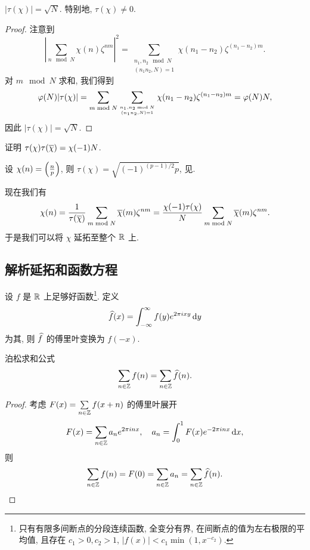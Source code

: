 \begin{lemma}{}{}
$|\tau(\chi)|=\sqrt{N}.$ 特别地, $\tau(\chi)\neq0$.
\end{lemma}
\begin{proof}
注意到
  \[\left|\sum_{n\mod N}\chi(n)\zeta^{nm}\right|^2=\sum_{\substack{n_1,n_2\mod N\\(n_1n_2,N)=1}}\chi(n_1-n_2)\zeta^{(n_1-n_2)m}.\]
对 $m\mod N$ 求和, 我们得到
  \[\varphi(N)|\tau(\chi)|=\sum_{m\mod N}\sum_{n_1,n_2\mod N\atop (n_1n_2,N)=1}\chi(n_1-n_2)\zeta^{(n_1-n_2)m}=\varphi(N)N,\]
因此 $|\tau(\chi)|=\sqrt N$.
\end{proof}

\begin{exercise}
证明 $\tau(\chi)\tau(\ov\chi)=\chi(-1)N$.
\end{exercise}

\begin{example}
设 $\chi(n)=\leg{n}{p}$, 则 $\tau(\chi)=\sqrt{(-1)^{(p-1)/2}p}$, 见\cite[Chapter IV, \S 3]{Lang1994}.
\end{example}


现在我们有
  \[\chi(n)=\frac1{\tau(\ov{\chi})}\sum_{m\mod N}\ov\chi(m)\zeta^{nm}
=\frac{\chi(-1)\tau(\chi)}N\sum_{m\mod N}\ov\chi(m)\zeta^{nm}.\]
于是我们可以将 $\chi$ 延拓至整个 $\BR$ 上.


\subsection{解析延拓和函数方程}
设 $f$ 是 $\BR$ 上足够好函数\footnote{只有有限多间断点的分段连续函数, 全变分有界, 在间断点的值为左右极限的平均值, 且存在 $c_1>0,c_2>1$, $|f(x)|<c_1\min (1,x^{-c_2})$.}.
定义
  \[\wh f(x)=\int_{-\infty}^\infty f(y)e^{2\pi ixy}\diff y\]
为其, 则 $\wh f$ 的傅里叶变换为 $f(-x)$. 

\begin{proposition}{泊松求和公式}{}
  \[\sum_{n\in\BZ} f(n)=\sum_{n\in\BZ} \wh f(n).\]
\end{proposition}
\begin{proof}
考虑 $F(x)=\suml_{n\in\BZ} f(x+n)$ 的傅里叶展开
  \[F(x)=\sum_{n\in\BZ} a_n e^{2\pi i nx},\quad a_n=\int_0^1 F(x)e^{-2\pi i nx}\diff x,\]
则
  \[\sum_{n\in\BZ} f(n)=F(0)=\sum_{n\in\BZ}a_n=\sum_{n\in\BZ}\wh f(n).\]
\end{proof}

